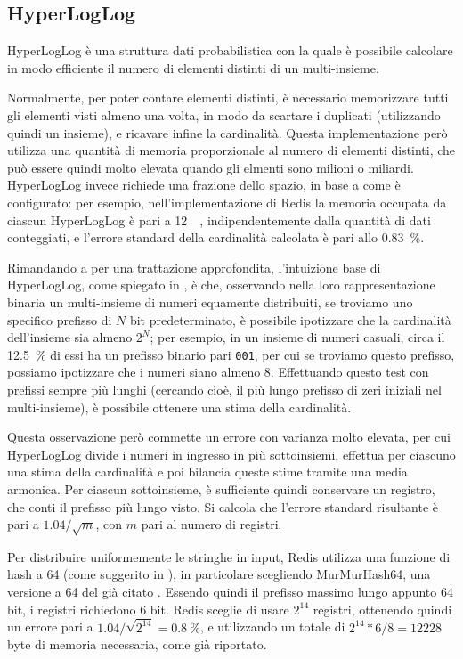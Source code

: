 \subsection{HyperLogLog}

HyperLogLog \cite{hyperloglog} è una struttura dati probabilistica con la quale è possibile
calcolare in modo efficiente il numero di elementi distinti di un multi-insieme. 

Normalmente, per poter contare elementi distinti, è necessario memorizzare tutti gli elementi visti
almeno una volta, in modo da scartare i duplicati (utilizzando quindi un insieme), e ricavare infine
la cardinalità. Questa implementazione però utilizza una quantità di memoria proporzionale al numero
di elementi distinti, che può essere quindi molto elevata quando gli elmenti sono milioni o
miliardi. HyperLogLog invece richiede una frazione dello spazio, in base a come è configurato: per
esempio, nell'implementazione di Redis la memoria occupata da ciascun HyperLogLog è pari a
\SI{12}{\kibi\byte}, indipendentemente dalla quantità di dati conteggiati, e l'errore standard della
cardinalità calcolata è pari allo \SI{0.83}{\percent}.

Rimandando a \cite{hyperloglog} per una trattazione approfondita, l'intuizione base di HyperLogLog,
come spiegato in \cite{hyperloglog-explain}, è che, osservando nella loro rappresentazione binaria
un multi-insieme di numeri equamente distribuiti, se troviamo uno specifico prefisso di $N$ bit
predeterminato, è possibile ipotizzare che la cardinalità dell'insieme sia almeno $2^N$; per
esempio, in un insieme di numeri casuali, circa il \SI{12.5}{\percent} di essi ha un prefisso
binario pari \verb|001|, per cui se troviamo questo prefisso, possiamo ipotizzare che i numeri siano
almeno \num{8}. Effettuando questo test con prefissi sempre più lunghi (cercando cioè, il più lungo
prefisso di zeri iniziali nel multi-insieme), è possibile ottenere una stima della cardinalità.

Questa osservazione però commette un errore con varianza molto elevata, per cui HyperLogLog divide i
numeri in ingresso in più sottoinsiemi, effettua per ciascuno una stima della cardinalità e poi
bilancia queste stime tramite una media armonica. Per ciascun sottoinsieme, è sufficiente quindi
conservare un registro, che conti il prefisso più lungo visto. Si calcola che l'errore standard 
risultante è pari a $1.04 / \sqrt{m}$, con $m$ pari al numero di registri. 

Per distribuire uniformemente le stringhe in input, Redis utilizza una funzione di hash a
\SI{64}{\bit} (come suggerito in \cite{hyperloglog-plusplus}), in particolare scegliendo
MurMurHash64, una versione a \SI{64}{\bit} del già citato
. Essendo quindi il
prefisso massimo lungo appunto 64 bit, i registri richiedono 6 bit. Redis sceglie di usare $2^{14}$
registri, ottenendo quindi un errore pari a $1.04 / \sqrt{2^{14}} = \SI{0.8}{\percent}$, e
utilizzando un totale di $2^{14} * 6 / 8 = \num{12228}$ byte di memoria necessaria, come già
riportato.

